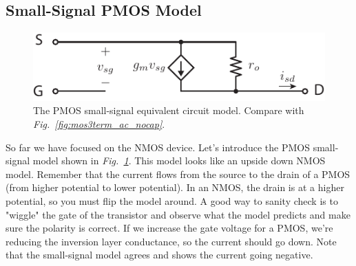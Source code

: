 \subsection{Small-Signal PMOS Model}
\begin{figure}[tb]
\centering
\includegraphics[scale=1]{pmos3term_dc}
\caption{The PMOS small-signal equivalent circuit model.  Compare with \emph{Fig.~\ref{fig:mos3term_ac_nocap}}.}
\label{fig:pmos3term_dc}
\end{figure}
So far we have focused on the NMOS device. Let's introduce the PMOS small-signal model shown in \emph{Fig.~\ref{fig:pmos3term_dc}}.  This model looks like an upside down NMOS model.  Remember that the current flows from the source to the drain of a PMOS (from higher potential to lower potential).  In an NMOS, the drain is at a higher potential, so you must flip the model around.   A good way to sanity check is to "wiggle" the gate of the transistor and observe what the model predicts and make sure the polarity is correct.  If we increase the gate voltage for a PMOS, we're reducing the inversion layer conductance, so the current should go down. Note that the small-signal model agrees and shows the current going negative.
